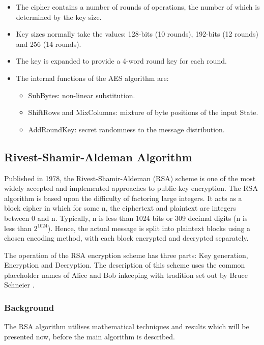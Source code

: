 \documentclass[a4paper,12pt]{report}
\begin{document}
\begin{itemize}
 \item The cipher contains a number of rounds of operations, the number of which is determined by the key size.
 \item Key sizes normally take the values: 128-bits (10 rounds), 192-bits (12 rounds) and 256 (14 rounds).
 \item The key is expanded to provide a 4-word round key for each round.
 \item The internal functions of the AES algorithm are:
    \begin{itemize}
     \item SubBytes: non-linear substitution.
     \item ShiftRows and MixColumns: mixture of byte positions of the input State.
     \item AddRoundKey: secret randomness to the message distribution.
    \end{itemize}

\end{itemize}

\subsection{Rivest-Shamir-Aldeman Algorithm}

Published in 1978, the Rivest-Shamir-Aldeman (RSA) scheme \cite{rsa} is one of the most widely accepted and implemented approaches to public-key encryption. The RSA algorithm is based upon the difficulty of factoring large integers. It acts as a block cipher in which for some n, the ciphertext and plaintext are integers between 0 and n. Typically, n is less than 1024 bits or 309 decimal digits (n is less than $2^{1024}$). Hence, the actual message is split into plaintext blocks using a chosen encoding method, with each block encrypted and decrypted separately. 

The operation of the RSA encryption scheme has three parts: Key generation, Encryption and Decryption. The description of this scheme uses the common placeholder names of Alice and Bob inkeeping with tradition set out by Bruce Schneier \cite{bruceschneier}.

\subsubsection{Background}

The RSA algorithm utilises mathematical techniques and results which will be presented now, before the main algorithm is described.
\end{document}
